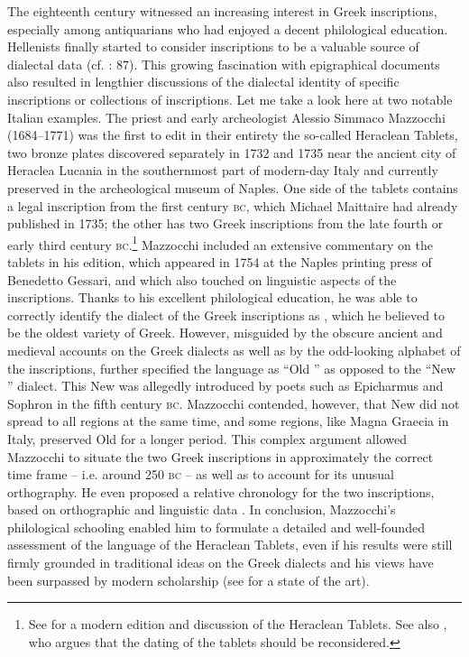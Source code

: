 The eighteenth century witnessed an increasing interest in Greek inscriptions, especially among antiquarians who had enjoyed a decent philological education. Hellenists finally started to consider inscriptions to be a valuable source of dialectal data (cf. \citealt{Walch1772}: 87). This growing fascination with epigraphical documents also resulted in lengthier discussions of the dialectal identity of specific inscriptions or collections of inscriptions. Let me take a look here at two notable Italian examples. The priest and early archeologist Alessio Simmaco Mazzocchi (1684–1771) was the first to edit in their entirety the so-called Heraclean Tablets, two bronze plates discovered separately in 1732 and 1735 near the ancient city of Heraclea Lucania in the southernmost part of modern-day Italy and currently preserved in the archeological museum of Naples. One side of the tablets contains a  legal inscription from the first century \textsc{bc}, which Michael Maittaire had already published in 1735; the other has two Greek inscriptions from the late fourth or early third century \textsc{bc}.\footnote{See \citet{Uguzzoni1968} for a modern edition and discussion of the Heraclean Tablets. See also \citet{Weiss2016}, who argues that the dating of the tablets should be reconsidered.} Mazzocchi included an extensive commentary on the tablets in his edition, which appeared in 1754 at the Naples printing press of Benedetto Gessari, and which also touched on linguistic aspects of the inscriptions. Thanks to his excellent philological education, he was able to correctly identify the dialect of the Greek inscriptions as , which he believed to be the oldest variety of Greek. However, misguided by the obscure ancient and medieval accounts on the Greek dialects as well as by the odd-looking alphabet of the inscriptions, \citet[118--120]{Mazzocchi1754} further specified the language as “Old ” as opposed to the “New ” dialect. This New  was allegedly introduced by  poets such as Epicharmus and Sophron in the fifth century \textsc{bc}. Mazzocchi contended, however, that New  did not spread to all regions at the same time, and some regions, like Magna Graecia in Italy, preserved Old  for a longer period. This complex argument allowed Mazzocchi to situate the two Greek inscriptions in approximately the correct time frame – i.e. around 250 \textsc{bc} – as well as to account for its unusual orthography. He even proposed a relative chronology for the two inscriptions, based on orthographic and linguistic data \citep[135]{Mazzocchi1754}. In conclusion, Mazzocchi’s philological schooling enabled him to formulate a detailed and well-founded assessment of the language of the Heraclean Tablets, even if his results were still firmly grounded in traditional ideas on the Greek dialects and his views have been surpassed by modern scholarship (see \citealt{Weiss2016} for a state of the art).

